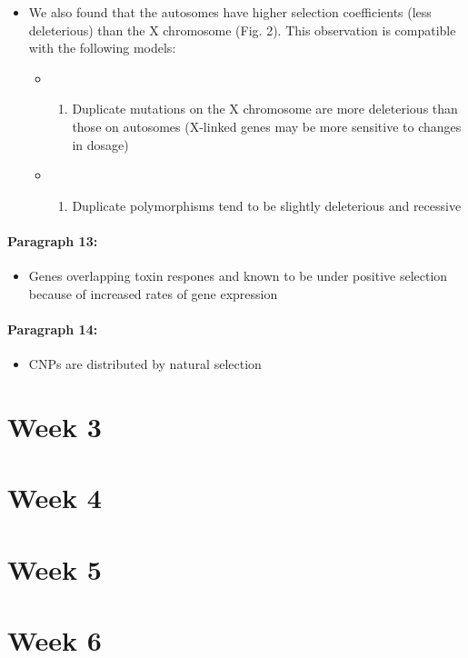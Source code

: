 \documentclass[]{book}
\providecommand{\tightlist}{%
  \setlength{\itemsep}{0pt}\setlength{\parskip}{0pt}}
\begin{document}
\begin{itemize}
\tightlist
\item
  We also found that the autosomes have higher selection coefficients (less deleterious) than the X chromosome (Fig. 2). This observation is compatible with the following models:

  \begin{itemize}
  \item
    \begin{enumerate}
    \def\labelenumi{\arabic{enumi}.}
    \tightlist
    \item
      Duplicate mutations on the X chromosome are more deleterious than those on autosomes (X-linked genes may be more sensitive to changes in dosage)\\
    \end{enumerate}
  \item
    \begin{enumerate}
    \def\labelenumi{\arabic{enumi}.}
    \setcounter{enumi}{1}
    \tightlist
    \item
      Duplicate polymorphisms tend to be slightly deleterious and recessive
    \end{enumerate}
  \end{itemize}
\end{itemize}

\hypertarget{paragraph-13}{%
\subsubsection{Paragraph 13:}\label{paragraph-13}}

\begin{itemize}
\tightlist
\item
  Genes overlapping toxin respones and known to be under positive selection because of increased rates of gene expression
\end{itemize}

\hypertarget{paragraph-14}{%
\subsubsection{Paragraph 14:}\label{paragraph-14}}

\begin{itemize}
\tightlist
\item
  CNPs are distributed by natural selection
\end{itemize}

\hypertarget{week-3}{%
\chapter{Week 3}\label{week-3}}

\hypertarget{week-4}{%
\chapter{Week 4}\label{week-4}}

\hypertarget{week-5}{%
\chapter{Week 5}\label{week-5}}

\hypertarget{week-6}{%
\chapter{Week 6}\label{week-6}}


\end{document}
